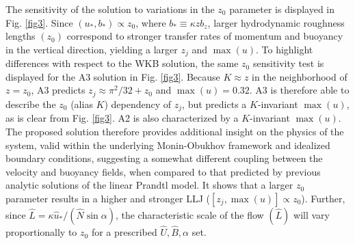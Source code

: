%
The sensitivity of the solution to variations in the $z_0$ parameter is displayed in Fig. \ref{fig3}.
Since $(u_*,b_*) \propto z_0$, where $b_* \equiv \kappa z b_z$, larger hydrodynamic roughness lengths $(z_0)$ correspond to stronger transfer rates of momentum and buoyancy in the vertical direction, yielding a larger $z_j$ and $\max{(u)}$. 
To highlight differences with respect to the WKB solution, the same $z_0$ sensitivity test is displayed for the A3 solution in Fig. \ref{fig3}.
Because $K \approx z$ in the neighborhood of $z=z_0$, A3 predicts $z_j \approx \pi^2/32+z_0$ and $\max{(u)} = 0.32$.  
A3 is therefore able to describe the $z_0$ (alias $K$) dependency of $z_j$, but predicts a $K$-invariant $\max{(u)}$, as is clear from Fig. \ref{fig3}.
A2 is also characterized by a $K$-invariant $\max{(u)}$.
The proposed solution therefore provides additional insight on the physics of the system, valid within the underlying Monin-Obukhov framework and idealized boundary conditions, suggesting a somewhat different coupling between the velocity and buoyancy fields, when compared to that predicted by previous analytic solutions of the linear Prandtl model. It shows that a larger $z_0$ parameter results in a higher and stronger LLJ ($[z_j,\max{(u)}] \propto z_0$).
Further, since $\hat{L} = \kappa \hat{u}_*/(\hat{N} \sin{\alpha})$, the characteristic scale of the flow $(\hat{L})$ will vary proportionally to $z_0$ for a prescribed $\hat{U},\hat{B},\alpha$ set. 

